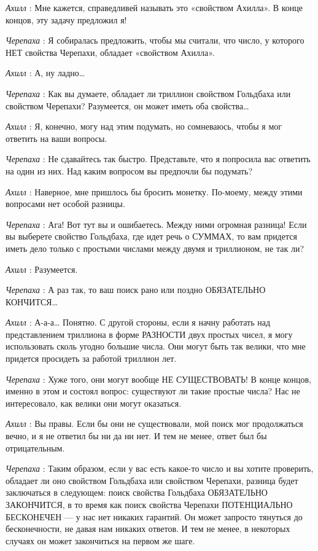 \emph{Ахилл} : Мне кажется, справедливей называть это «свойством Ахилла». В конце концов, эту задачу предложил я!

\emph{Черепаха} : Я собиралась предложить, чтобы мы считали, что число, у которого НЕТ свойства Черепахи, обладает «свойством Ахилла».

\emph{Ахилл} : А, ну ладно\ldots{}

\emph{Черепаха} : Как вы думаете, обладает ли триллион свойством Гольдбаха или свойством Черепахи? Разумеется, он может иметь оба свойства\ldots{}

\emph{Ахилл} : Я, конечно, могу над этим подумать, но сомневаюсь, чтобы я мог ответить на ваши вопросы.

\emph{Черепаха} : Не сдавайтесь так быстро. Представьте, что я попросила вас ответить на один из них. Над каким вопросом вы предпочли бы подумать?

\emph{Ахилл} : Наверное, мне пришлось бы бросить монетку. По-моему, между этими вопросами нет особой разницы.

\emph{Черепаха} : Ага! Вот тут вы и ошибаетесь. Между ними огромная разница! Если вы выберете свойство Гольдбаха, где идет речь о СУММАХ, то вам придется иметь дело только с простыми числами между двумя и триллионом, не так ли?

\emph{Ахилл} : Разумеется.

\emph{Черепаха} : А раз так, то ваш поиск рано или поздно ОБЯЗАТЕЛЬНО КОНЧИТСЯ\ldots{}

\emph{Ахилл} : А-а-а\ldots{} Понятно. С другой стороны, если я начну работать над представлением триллиона в форме РАЗНОСТИ двух простых чисел, я могу использовать сколь угодно большие числа. Они могут быть так велики, что мне придется просидеть за работой триллион лет.

\emph{Черепаха} : Хуже того, они могут вообще НЕ СУЩЕСТВОВАТЬ! В конце концов, именно в этом и состоял вопрос: существуют ли такие простые числа? Нас не интересовало, как велики они могут оказаться.

\emph{Ахилл} : Вы правы. Если бы они не существовали, мой поиск мог продолжаться вечно, и я не ответил бы ни да ни нет. И тем не менее, ответ был бы отрицательным.

\emph{Черепаха} : Таким образом, если у вас есть какое-то число и вы хотите проверить, обладает ли оно свойством Гольдбаха или свойством Черепахи, разница будет заключаться в следующем: поиск свойства Гольдбаха ОБЯЗАТЕЛЬНО ЗАКОНЧИТСЯ, в то время как поиск свойства Черепахи ПОТЕНЦИАЛЬНО БЕСКОНЕЧЕН --- у нас нет никаких гарантий. Он может запросто тянуться до бесконечности, не давая нам никаких ответов. И тем не менее, в некоторых случаях он может закончиться на первом же шаге.


